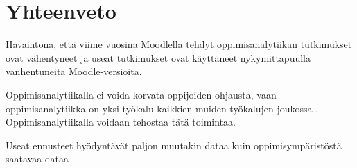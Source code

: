 \chapter{Yhteenveto\label{yhteenveto}}
\color{red}

Havaintona, että viime vuosina Moodlella tehdyt oppimisanalytiikan tutkimukset ovat vähentyneet ja useat tutkimukset ovat käyttäneet nykymittapuulla vanhentuneita Moodle-versioita.

Oppimisanalytiikalla ei voida korvata oppijoiden ohjausta, vaan oppimisanalytiikka on yksi työkalu kaikkien muiden työkalujen joukossa \citep{auvinenOppimisanalytiikkaTuleeOletko2017}. Oppimisanalytiikalla voidaan tehostaa tätä toimintaa.

Useat ennusteet hyödyntävät paljon muutakin dataa kuin oppimisympäristöstä saatavaa dataa
\color{black}